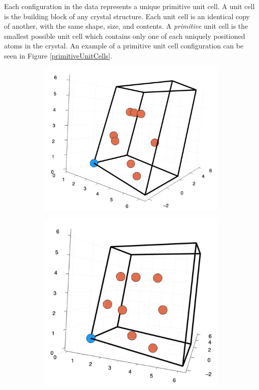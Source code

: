 \par Each configuration in the data represents a unique primitive unit cell. A unit cell is the building block of any crystal structure. Each unit cell is an identical copy of another, with the same shape, size, and contents. A \textit{primitive} unit cell is the smallest possible unit cell which contains only one of each uniquely positioned atoms in the crystal. An example of a primitive unit cell configuration can be seen in Figure \ref{primitiveUnitCells}.

\begin{figure}
  \begin{subfigure}{0.25\textwidth}
    \includegraphics[width=\linewidth]{Figures/primitiveCell1}
    \label{primitiveFirst}
  \end{subfigure}%
  \hspace*{\fill}   %
  \begin{subfigure}{0.23\textwidth}
    \includegraphics[width=\linewidth]{Figures/primitiveCell2}

\end{subfigure}
\end{figure}
